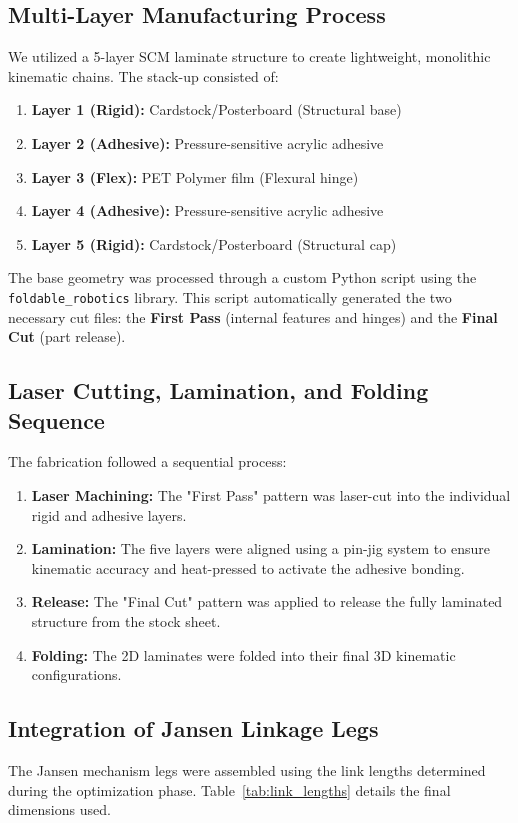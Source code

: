 \documentclass[11pt, a4paper]{article}
\begin{document}
\subsection{Multi-Layer Manufacturing Process}
We utilized a 5-layer SCM laminate structure to create lightweight, monolithic kinematic chains. The stack-up consisted of:
\begin{enumerate}
    \item \textbf{Layer 1 (Rigid):} Cardstock/Posterboard (Structural base)
    \item \textbf{Layer 2 (Adhesive):} Pressure-sensitive acrylic adhesive
    \item \textbf{Layer 3 (Flex):} PET Polymer film (Flexural hinge)
    \item \textbf{Layer 4 (Adhesive):} Pressure-sensitive acrylic adhesive
    \item \textbf{Layer 5 (Rigid):} Cardstock/Posterboard (Structural cap)
\end{enumerate}

The base geometry was processed through a custom Python script using the \texttt{foldable\_robotics} library. This script automatically generated the two necessary cut files: the \textbf{First Pass} (internal features and hinges) and the \textbf{Final Cut} (part release).

\subsection{Laser Cutting, Lamination, and Folding Sequence}
The fabrication followed a sequential process:
\begin{enumerate}
    \item \textbf{Laser Machining:} The "First Pass" pattern was laser-cut into the individual rigid and adhesive layers.
    \item \textbf{Lamination:} The five layers were aligned using a pin-jig system to ensure kinematic accuracy and heat-pressed to activate the adhesive bonding.
    \item \textbf{Release:} The "Final Cut" pattern was applied to release the fully laminated structure from the stock sheet.
    \item \textbf{Folding:} The 2D laminates were folded into their final 3D kinematic configurations.
\end{enumerate}

\subsection{Integration of Jansen Linkage Legs}
The Jansen mechanism legs were assembled using the link lengths determined during the optimization phase. Table~\ref{tab:link_lengths} details the final dimensions used.
\end{document}
